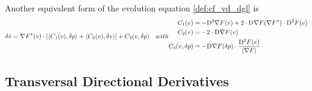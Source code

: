 


Another equivalent form of the evolution equation \eqref{def:cf_vd_dgl} is
\begin{subequations}
    \begin{align}
        \vardiff \dot{ v }   &=
        \darg{F}( v ) \mult
        [   \skap{ C_1( v ) }{ \vardiff p }  + 
            \skap{ C_2( v ) }{ \vardiff v }     ]  +
        C_3( v, \vardiff p )
    \end{align}
    with
    \begin{align}
        C_1( v )  &=
        -\diff{2}{\grad{F}}( v )  +
        2 \mult \diff{}{\grad{F}}( \darg{F} ) \mult \diff{2}{F}( v )  \\
        C_2( v )  &=
        -2 \mult \diff{}{\grad{F}}( v )  \\
        C_3( v, \vardiff p )  &=
        - \diff{}{\grad{F}}( \vardiff p ) \mult \frac{ \diff{2}{F}(v ) }{ \skaq{ \grad{F} } }
    \end{align}
\end{subequations}


\subsection{Transversal Directional Derivatives}



